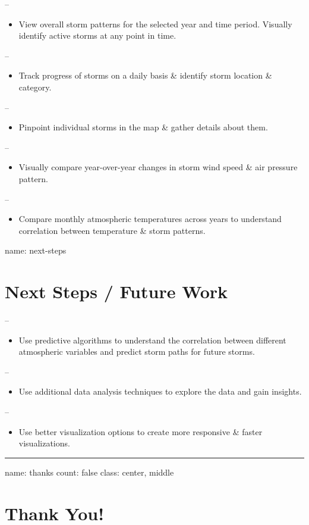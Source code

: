 \documentclass[]{article}
\providecommand{\tightlist}{%
  \setlength{\itemsep}{0pt}\setlength{\parskip}{0pt}}
\begin{document}
--

\begin{itemize}
\tightlist
\item
  View overall storm patterns for the selected year and time period.
  Visually identify active storms at any point in time.
\end{itemize}

--

\begin{itemize}
\tightlist
\item
  Track progress of storms on a daily basis \& identify storm location
  \& category.
\end{itemize}

--

\begin{itemize}
\tightlist
\item
  Pinpoint individual storms in the map \& gather details about them.
\end{itemize}

--

\begin{itemize}
\tightlist
\item
  Visually compare year-over-year changes in storm wind speed \& air
  pressure pattern.
\end{itemize}

--

\begin{itemize}
\tightlist
\item
  Compare monthly atmospheric temperatures across years to understand
  correlation between temperature \& storm patterns.
\end{itemize}

name: next-steps

\section{Next Steps / Future Work}\label{next-steps-future-work}

--

\begin{itemize}
\tightlist
\item
  Use predictive algorithms to understand the correlation between
  different atmospheric variables and predict storm paths for future
  storms.
\end{itemize}

--

\begin{itemize}
\tightlist
\item
  Use additional data analysis techniques to explore the data and gain
  insights.
\end{itemize}

--

\begin{itemize}
\tightlist
\item
  Use better visualization options to create more responsive \& faster
  visualizations.
\end{itemize}

\begin{center}\rule{0.5\linewidth}{\linethickness}\end{center}

name: thanks count: false class: center, middle

\section{Thank You!}\label{thank-you}
\end{document}
